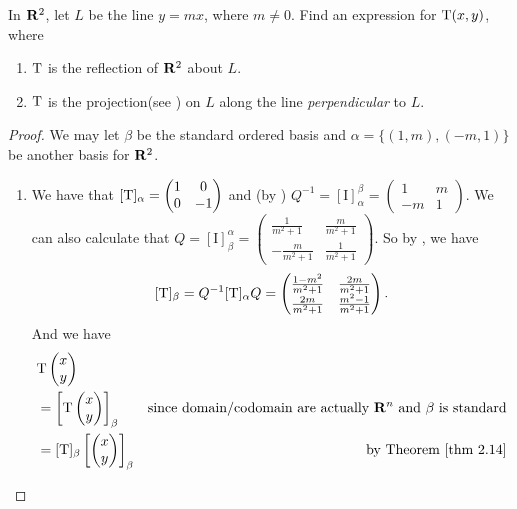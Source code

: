 \begin{exercise} \label{exercise 2.5.7}
In \(\mathbf{R}^2\), let \(L\) be the line \(y = mx\), where \(m \ne 0\).
Find an expression for \(\mathrm{T}(x, y)\), where
\begin{enumerate}
\item \(\mathrm{T}\) is the reflection of \(\mathbf{R}^2\) about \(L\).
\item \(\mathrm{T}\) is the projection(see ) on \(L\) along the line \emph{perpendicular} to \(L\).
\end{enumerate}
\end{exercise}

\begin{proof}
We may let \(\beta\) be the standard ordered basis and \(\alpha = \{ (1, m), (-m, 1) \}\) be another basis for \(\mathbf{R}^2\).
\begin{enumerate}
\item We have that \([\mathrm{T}]_{\alpha} = \begin{pmatrix} 1 & 0 \\ 0 & -1 \end{pmatrix}\) and (by ) \(Q^{-1} = [\mathrm{I}]_{\alpha}^{\beta} = \begin{pmatrix} 1 & m \\ -m & 1 \end{pmatrix}\).
We can also calculate that \(Q = [\mathrm{I}]_{\beta}^{\alpha} = \begin{pmatrix} \frac{1}{m^2 + 1} & \frac{m}{m^2 + 1} \\ -\frac{m}{m^2 + 1} & \frac{1}{m^2 + 1} \end{pmatrix}\).
So by , we have
\[
    [\mathrm{T}]_{\beta} = Q^{-1} [\mathrm{T}]_{\alpha} Q = \begin{pmatrix}
        \frac{1 - m^2}{m^2 + 1} & \frac{2m}{m^2 + 1} \\
        \frac{2m}{m^2 + 1} & \frac{m^2 - 1}{m^2 + 1}
    \end{pmatrix}.
\]
And we have
\begin{align*}
    & \T \begin{pmatrix} x \\ y \end{pmatrix} \\
    & = \left[ \T \begin{pmatrix} x \\ y \end{pmatrix} \right]_{\beta} & \text{since domain/codomain are actually \(\SET{R}^n\) and \(\beta\) is standard} \\
    & = [\T]_{\beta} \left[ \begin{pmatrix} x \\ y \end{pmatrix} \right]_{\beta} & \text{by \THM{2.14}} \\

\end{align*}
\end{enumerate}
\end{proof}
